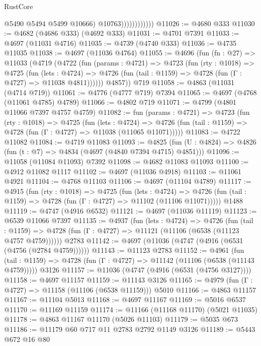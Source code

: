 \begin{lexlean}{RustCore}
\begin{coremodule}
                              @5490
                              @5494
                              @5499
                              @10666)
                            @10763))))))))))))
@11026 := @4680 @333
@11030 := @4682 (@4686 @333) (@4692 @333)
@11031 := @4701 @7391
@11033 := @4697 (@11031 @4716)
@11035 := @4739 (@4740 @333)
@11036 := @4735 @11035
@11038 := @4697 (@11036 @4764)
@11055 := @4696
    (fun (fn : @27) =>
    @11033
      (@4719
        (@4722
          (fun (params : @4721) =>
          @4723
            (fun (rty : @1018) =>
            @4725
              (fun (lets : @4724) =>
              @4726 (fun (tail : @1159) => @4728 (fun (Γ : @4727) => @11038 @4811))))))
        @4857))
    @719
@11058 := @4863 (@11031 (@4714 @719))
@11061 := @4776 (@4777 @719) @7394
@11065 := @4697 (@4768 (@11061 @4785) @4789)
@11066 := @4802 @719
@11071 := @4799 (@4801 @11066 @7397 @4757 @4759)
@11082 := fun (params : @4721) =>
  @4723
    (fun (rty : @1018) =>
    @4725
      (fun (lets : @4724) =>
      @4726 (fun (tail : @1159) => @4728 (fun (Γ : @4727) => @11038 (@11065 @11071)))))
@11083 := @4722 @11082
@11084 := @4719 @11083
@11093 := @4825 (fun (U : @4824) => @4826 (fun (t : @7) => @4834 (@4697 (@4840 @7394 @4715) @4851)))
@11096 := @11058 (@11084 @11093) @7392
@11098 := @4682 @11083 @11093
@11100 := @4912 @11082 @1117
@11102 := @4697 (@11036 @4918)
@11103 := @11061 @4921
@11104 := @4768 @11103
@11106 := @4697 (@11104 @4789)
@11117 := @4915
    (fun (rty : @1018) =>
    @4725
      (fun (lets : @4724) =>
      @4726 (fun (tail : @1159) => @4728 (fun (Γ : @4727) => @11102 (@11106 @11071)))))
    @1488
@11119 := @4747 (@4916 @6532)
@11121 := @4697 (@11036 @11119)
@11123 := @6539 @11066 @7397
@11135 := @4937
    (fun (lets : @4724) =>
    @4726
      (fun (tail : @1159) =>
      @4728 (fun (Γ : @4727) => @11121 (@11106 (@6538 (@11123 @4757 @4759))))))
    @2783
@11142 := @4697 (@11036 (@4747 (@4916 (@6531 (@4756 (@2784 @4759))))))
@11143 := @11123 @2783
@11152 := @4961
    (fun (tail : @1159) => @4728 (fun (Γ : @4727) => @11142 (@11106 (@6538 (@11143 @4759)))))
    @3126
@11157 := @11036 (@4747 (@4916 (@6531 (@4756 @3127))))
@11158 := @4697 @11157
@11159 := @11143 @3126
@11165 := @4979 (fun (Γ : @4727) => @11158 (@11106 (@6538 @11159))) @5010
@11166 := @4863 @11157
@11167 := @11104 @5013
@11168 := @4697 @11167
@11169 := @5016 @6537
@11170 := @11169 @11159
@11174 := @11166 (@11168 @11170) (@5021 @11035)
@11178 := @4863 @11167 @11170 (@5026 @11103)
@11179 := @5035 @673
@11186 := @11179 @60 @717 @11 @2783 @2792 @1149 @3126
@11189 := @5443 @672 @16 @80

\end{coremodule}
\end{lexlean}
